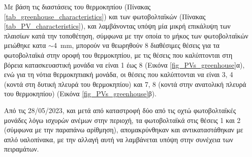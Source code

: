 \documentclass[12pt, a4paper]{report} %
\begin{document}
Με βάση τις διαστάσεις του θερμοκηπίου (Πίνακας \ref{tab_greenhouse_characteristics}) και των φωτοβολταϊκών (Πίνακας 
\ref{tab_PV_characteristics}), και λαμβάνοντας υπόψη μία μικρή επικάλυψη των πλαισίων κατά την τοποθέτηση, σύμφωνα με 
την οποία το μήκος των φωτοβολταϊκών μειώθηκε κατα $\sim$\SI{4}{\milli\meter}, μπορούν να θεωρηθούν 8 διαθέσιμες θέσεις 
για τα φωτοβολταϊκά στην οροφή του θερμοκηπίου, με τις θέσεις που καλύπτονται στη βόρεια κατασκευαστική μονάδα να είναι 
1 έως 8 (Εικόνα \ref{fig_PVs_greenhouse}α), ενώ για τη νότια θερμοκηπιακή μονάδα, οι θέσεις που καλύπτονται να είναι 3, 
4 (κοντά στη δυτική πλευρά του θερμοκηπίου) και 7, 8 (κοντά στην ανατολική πλευρά του θερμοκηπίου) (Εικόνα 
\ref{fig_PVs_greenhouse}β).

Από τις 28/05/2023, και μετά από καταστροφή δύο από τις οχτώ φωτοβολταϊκές μονάδες λόγω ισχυρών ανέμων στην περιοχή, 
τα φωτοβολταϊκά στις θέσεις 1 και 2 (σύμφωνα με την παραπάνω αρίθμηση), απομακρύνθηκαν και αντικαταστάθηκαν με απλό 
υαλοπίνακα, με την αλλαγή αυτή να λαμβάνεται υπόψη στην συνέχεια των πειραμάτων.
\end{document}

